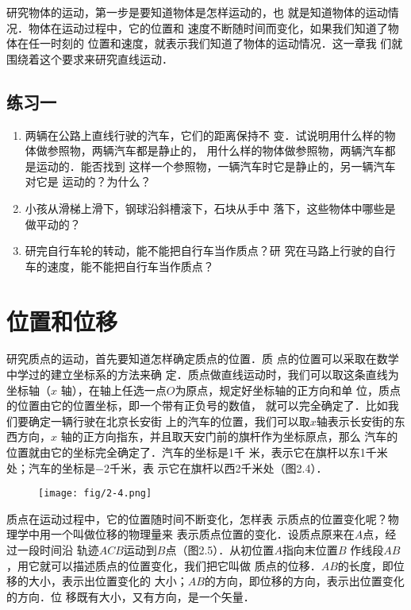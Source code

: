     研究物体的运动，第一步是要知道物体是怎样运动的，也
就是知道物体的运动情况．物体在运动过程中，它的位置和
速度不断随时间而变化，如果我们知道了物体在任一时刻的
位置和速度，就表示我们知道了物体的运动情况．这一章我
们就围绕着这个要求来研究直线运动．

 \subsection*{练习一}
\begin{enumerate}
\item 两辆在公路上直线行驶的汽车，它们的距离保持不
变．试说明用什么样的物体做参照物，两辆汽车都是静止的，
用什么样的物体做参照物，两辆汽车都是运动的．能否找到
这样一个参照物，一辆汽车时它是静止的，另一辆汽车对它是
运动的？为什么？

\item 小孩从滑梯上滑下，钢球沿斜槽滚下，石块从手中
落下，这些物体中哪些是做平动的？

\item 研完自行车轮的转动，能不能把自行车当作质点？研
究在马路上行驶的自行车的速度，能不能把自行车当作质点？
\end{enumerate}

\section{位置和位移}
    研究质点的运动，首先要知道怎样确定质点的位置．质
点的位置可以采取在数学中学过的建立坐标系的方法来确
定．质点做直线运动时，我们可以取这条直线为坐标轴（$x$
轴），在轴上任选一点$O$为原点，规定好坐标轴的正方向和单
位，质点的位置由它的位置坐标，即一个带有正负号的数值，
就可以完全确定了．比如我们要确定一辆行驶在北京长安街
上的汽车的位置，我们可以取$x$轴表示长安街的东西方向，$x$
轴的正方向指东，并且取天安门前的旗杆作为坐标原点，那么
汽车的位置就由它的坐标完全确定了．汽车的坐标是1千
米，表示它在旗杆以东1千米处；汽车的坐标是$-2$千米，表
示它在旗杆以西2千米处（图2.4）．
\begin{figure}[htp]
    \centering
\texttt{[image: fig/2-4.png]}
    \caption{}
    \end{figure}

    质点在运动过程中，它的位置随时间不断变化，怎样表
示质点的位置变化呢？物理学中用一个叫做位移的物理量来
表示质点位置的变化．设质点原来在$A$点，经过一段时间沿
轨迹$ACB$运动到$B$点（图2.5）．从初位置$A$指向末位置$B$
作线段$AB$，用它就可以描述质点的位置变化，我们把它叫做
质点的位移．$AB$的长度，即位移的大小，表示出位置变化的
大小；$AB$的方向，即位移的方向，表示出位置变化的方向．位
移既有大小，又有方向，是一个矢量．

